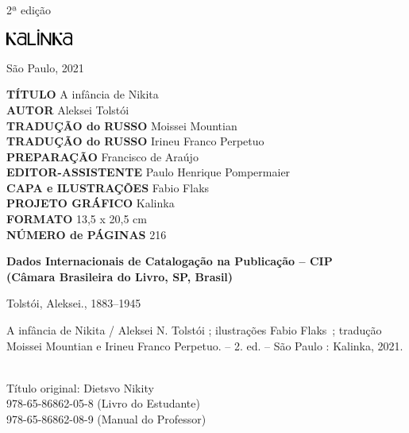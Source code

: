 {\vfill

\begin{center}
2ª edição

\smallskip

\includegraphics[width=2.2cm]{./LOGOTIPO_KALINKA.jpg}

São Paulo, 2021
\end{center}

\pagebreak
\flushleft
\pagestyle{empty}
\tiny


\textbf{TÍTULO} A infância de Nikita\\
\textbf{AUTOR} Aleksei Tolstói\\
\textbf{TRADUÇÃO do RUSSO} Moissei Mountian\\
\textbf{TRADUÇÃO do RUSSO} Irineu Franco Perpetuo\\
\textbf{PREPARAÇÃO} Francisco de Araújo\\
\textbf{EDITOR-ASSISTENTE} Paulo Henrique Pompermaier\\
\textbf{CAPA e ILUSTRAÇÕES} Fabio Flaks\\
\textbf{PROJETO GRÁFICO} Kalinka\\
\textbf{FORMATO} 13,5 x 20,5 cm\\
\textbf{NÚMERO de PÁGINAS} 216\\

\bigskip

\begin{flushleft}
\textbf{Dados Internacionais de Catalogação na Publicação -- CIP}\\
\textbf{(Câmara Brasileira do Livro, SP, Brasil)}\\
\hrulefill
\end{flushleft}
\hspace{5pt}Tolstói, Aleksei., 1883--1945\\
\hspace{20pt}\parbox{185pt}{A infância de Nikita / Aleksei N. Tolstói ; ilustrações Fabio Flaks~; tradução Moissei Mountian e Irineu Franco Perpetuo. -- 2. ed. -- São Paulo :
Kalinka, 2021.}\\[6pt]

\hspace{20pt}Título original: Dietsvo Nikity\\
\hspace{20pt} 978-65-86862-05-8 (Livro do Estudante)\\
\hspace{20pt} 978-65-86862-08-9 (Manual do Professor)\\[6pt]

}
